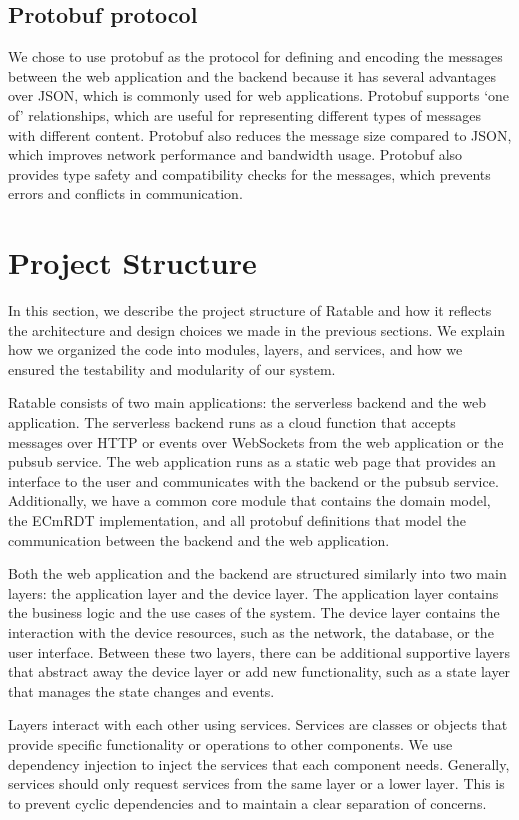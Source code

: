 \documentclass[
	ngerman,
	ruledheaders=section,   %
	class=report,		    %
	thesis={type=bachelor}, %
	accentcolor=9c,			%
	custommargins=true,    %
	marginpar=false,        %
	parskip=half-,          %
	fontsize=11pt,          %
]{tudapub}
\begin{document}
\subsection{Protobuf protocol}
We chose to use protobuf as the protocol for defining and encoding the messages between the web application and the backend because it has several advantages over JSON, which is commonly used for web applications. Protobuf supports ‘one of’ relationships, which are useful for representing different types of messages with different content. Protobuf also reduces the message size compared to JSON, which improves network performance and bandwidth usage. Protobuf also provides type safety and compatibility checks for the messages, which prevents errors and conflicts in communication.

\section{Project Structure}
In this section, we describe the project structure of Ratable and how it reflects the architecture and design choices we made in the previous sections. We explain how we organized the code into modules, layers, and services, and how we ensured the testability and modularity of our system.

Ratable consists of two main applications: the serverless backend and the web application. The serverless backend runs as a cloud function that accepts messages over HTTP or events over WebSockets from the web application or the pubsub service. The web application runs as a static web page that provides an interface to the user and communicates with the backend or the pubsub service. Additionally, we have a common core module that contains the domain model, the ECmRDT implementation, and all protobuf definitions that model the communication between the backend and the web application.

Both the web application and the backend are structured similarly into two main layers: the application layer and the device layer. The application layer contains the business logic and the use cases of the system. The device layer contains the interaction with the device resources, such as the network, the database, or the user interface. Between these two layers, there can be additional supportive layers that abstract away the device layer or add new functionality, such as a state layer that manages the state changes and events.

Layers interact with each other using services. Services are classes or objects that provide specific functionality or operations to other components. We use dependency injection to inject the services that each component needs. Generally, services should only request services from the same layer or a lower layer. This is to prevent cyclic dependencies and to maintain a clear separation of concerns.
\end{document}
